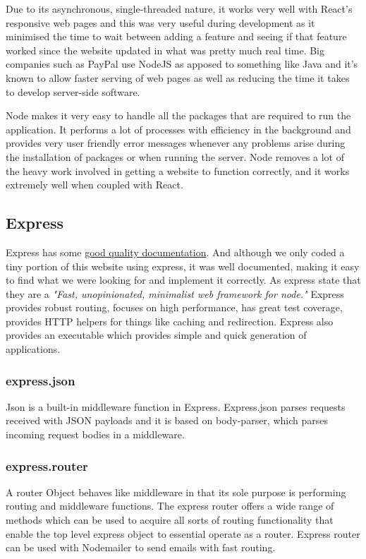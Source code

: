 Due to its asynchronous, single-threaded nature, it works very well with React's responsive web pages and this was very useful during development as it minimised the time to wait between adding a feature and seeing if that feature worked since the website updated in what was pretty much real time. \cite{PaypalNodeJS}Big companies such as PayPal use NodeJS as apposed to something like Java and it's known to allow faster serving of web pages as well as reducing the time it takes to develop server-side software.\par
Node makes it very easy to handle all the packages that are required to run the application. It performs a lot of processes with efficiency in the background and provides very user friendly error messages whenever any problems arise during the installation of packages or when running the server. Node removes a lot of the heavy work involved in getting a website to function correctly, and it works extremely well when coupled with React.

\subsection{Express}
Express has some \href{https://expressjs.com/en/5x/api.html}{good quality documentation}. And although we only coded a tiny portion of this website using express, it was well documented, making it easy to find what we were looking for and implement it correctly. As express state that they are a \cite{ExpressRM}\emph{"Fast, unopinionated, minimalist web framework for node."} Express provides robust routing, focuses on high performance, has great test coverage, provides HTTP helpers for things like caching and redirection. Express also provides an executable which provides simple and quick generation of applications. 

\subsubsection{express.json} 
Json is a built-in middleware function in Express. Express.json parses requests received with JSON payloads and it is based on body-parser, which parses incoming request bodies in a middleware. 

\subsubsection{express.router}
A router Object behaves like middleware in that its sole purpose is performing routing and middleware functions. The express router offers a wide range of methods which can be used to acquire all sorts of routing functionality that enable the top level express object to essential operate as a router. Express router can be used with Nodemailer to send emails with fast routing.

